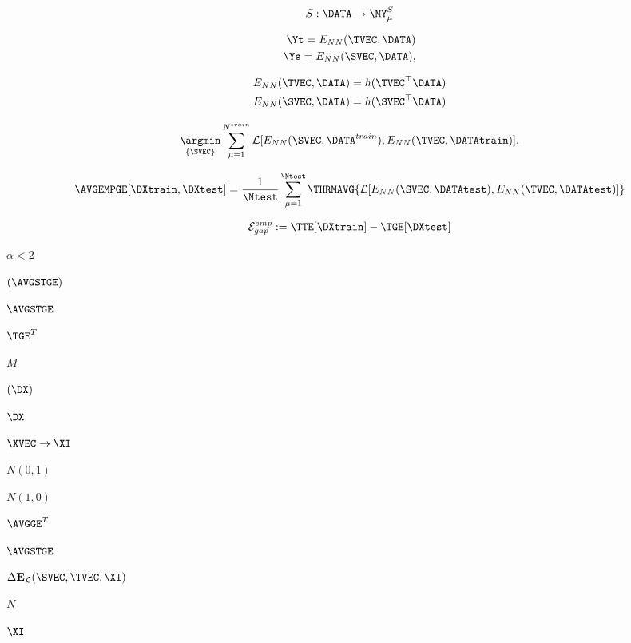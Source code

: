 \begin{align}
S:\DATA\rightarrow \MY^{S}_{\mu}
\end{align}

\begin{align}
\Yt=E_{NN}(\TVEC, \DATA) \\ \nonumber
\Ys=E_{NN}(\SVEC,\DATA) ,
\end{align}

\begin{align}
\label{eqn:ENN}
E_{NN}(\TVEC, \DATA)=h(\TVEC^{\top}\DATA) \\ \nonumber
E_{NN}(\SVEC, \DATA)=h(\SVEC^{\top}\DATA)
\end{align}

\begin{align}
\underset{\{\SVEC\}}{\argmin}\sum_{\mu=1}^{N^{train}}\mathcal{L}[E_{NN}(\SVEC,\DATA^{train}),E_{NN}(\TVEC,\DATAtrain)]   ,
\label{eqn:student-learning-task}
\end{align}

\begin{align}
\AVGEMPGE[\DXtrain, \DXtest]=\frac{1}{\Ntest}\sum_{\mu=1}^{\Ntest}
\THRMAVG{\mathcal{L}[E_{NN}(\SVEC,\DATAtest),E_{NN}(\TVEC,\DATAtest)]}
\label{eqn:emp_gen_error}
\end{align}


\begin{align}
  \label{eqn:gen_gap}
  \mathcal{E}^{emp}_{gap}:= \TTE[\DXtrain]- \TGE[\DXtest]
\end{align}


$\alpha<2$


$(\AVGSTGE)$

$\AVGSTGE$

$\TGE^{T}$

$M$

$(\DX)$

$\DX$

$\XVEC\rightarrow\XI$

$N(0,1)$

$N(1,0)$

$\AVGGE^{T}$

$\AVGSTGE$

$\Delta\mathbf{E}_{\mathcal{L}}(\SVEC,\TVEC, \XI)$

$N$

$\XI$

